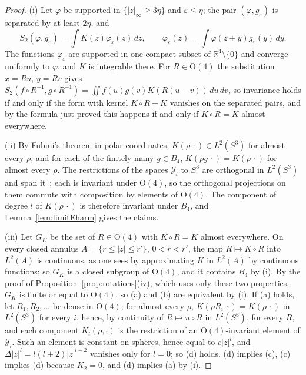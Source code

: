 \documentclass[aps,prd,twocolumn,superscriptaddress,nofootinbib,longbibliography,floatfix,amsmath,amssymb,10pt]{revtex4-2}
\theoremstyle{definition}
\theoremstyle{remark}
\newcommand{\R}{\mathbb{R}}
\begin{document}
\begin{proof}
(i) Let $\varphi$ be supported in $\{|z|_\infty\ge3\eta\}$ and
$\varepsilon\le\eta$; the pair $(\varphi,g_\varepsilon)$ is separated by
at least $2\eta$, and
\[
S_2(\varphi,g_\varepsilon)=\int K(z)\varphi_\varepsilon(z)\,dz,\qquad
\varphi_\varepsilon(z)=\int\varphi(z+y)g_\varepsilon(y)\,dy .
\]
The functions $\varphi_\varepsilon$ are supported in one compact subset of
$\R^4\setminus\{0\}$ and converge uniformly to $\varphi$, and $K$ is
integrable there. For $R\in\mathrm O(4)$ the substitution $x=Ru$, $y=Rv$
gives $S_2(f\circ R^{-1},g\circ R^{-1})=\iint f(u)g(v)K(R(u-v))\,du\,dv$, so
invariance holds if and only if the form with kernel $K\circ R-K$ vanishes
on the separated pairs, and by the formula just proved this happens if and
only if $K\circ R=K$ almost everywhere.

(ii) By Fubini's theorem in polar coordinates, $K(\rho\,\cdot)\in L^2(S^3)$
for almost every $\rho$, and for each of the finitely many $g\in B_4$,
$K(\rho g\,\cdot)=K(\rho\,\cdot)$ for almost every $\rho$. The restrictions
of the spaces $\mathcal Y_l$ to $S^3$ are orthogonal in $L^2(S^3)$ and span
it~\cite[Ch.~IV]{SW71}; each is invariant under $\mathrm O(4)$, so the
orthogonal projections on them commute with composition by elements of
$\mathrm O(4)$. The component of degree $l$ of $K(\rho\,\cdot)$ is
therefore invariant under $B_4$, and Lemma~\ref{lem:limitEharm} gives the
claims.

(iii) Let $G_K$ be the set of $R\in\mathrm O(4)$ with $K\circ R=K$ almost
everywhere. On every closed annulus $A=\{r\le|z|\le r'\}$, $0<r<r'$, the
map $R\mapsto K\circ R$ into $L^2(A)$ is continuous, as one sees by
approximating $K$ in $L^2(A)$ by continuous functions; so $G_K$ is a closed
subgroup of $\mathrm O(4)$, and it contains $B_4$ by (i). By the proof of
Proposition~\ref{prop:rotations}(iv), which uses only these two properties,
$G_K$ is finite or equal to $\mathrm O(4)$, so (a) and (b) are equivalent
by (i). If (a) holds, let $R_1,R_2,\dots$ be dense in $\mathrm O(4)$; for
almost every $\rho$, $K(\rho R_i\,\cdot)=K(\rho\,\cdot)$ in $L^2(S^3)$ for
every $i$, hence, by continuity of $R\mapsto u\circ R$ in $L^2(S^3)$, for
every $R$, and each component $K_l(\rho,\cdot)$ is the restriction of an
$\mathrm O(4)$-invariant element of $\mathcal Y_l$. Such an element is
constant on spheres, hence equal to $c|z|^l$, and
$\Delta|z|^l=l(l+2)|z|^{l-2}$ vanishes only for $l=0$; so (d) holds. (d)
implies (c), (c) implies (d) because $K_2=0$, and (d) implies (a) by (i).
\end{proof}
\end{document}

